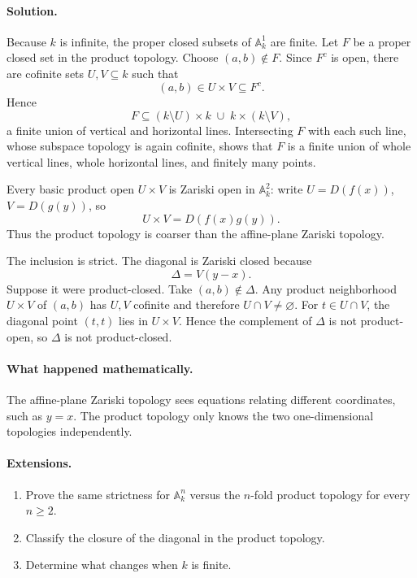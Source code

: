 \paragraph{Solution.}
Because \(k\) is infinite, the proper closed subsets of \(\mathbb A_k^1\) are finite.  Let
\(F\) be a proper closed set in the product topology.  Choose \((a,b)\notin F\).  Since
\(F^c\) is open, there are cofinite sets \(U,V\subseteq k\) such that
\[
(a,b)\in U\times V\subseteq F^c.
\]
Hence
\[
F\subseteq (k\setminus U)\times k\;\cup\;k\times(k\setminus V),
\]
a finite union of vertical and horizontal lines.  Intersecting \(F\) with each such line,
whose subspace topology is again cofinite, shows that \(F\) is a finite union of whole
vertical lines, whole horizontal lines, and finitely many points.

Every basic product open \(U\times V\) is Zariski open in \(\mathbb A_k^2\): write
\(U=D(f(x))\), \(V=D(g(y))\), so
\[
U\times V=D(f(x)g(y)).
\]
Thus the product topology is coarser than the affine-plane Zariski topology.

The inclusion is strict.  The diagonal is Zariski closed because
\[
\Delta=V(y-x).
\]
Suppose it were product-closed.  Take \((a,b)\notin\Delta\).  Any product neighborhood
\(U\times V\) of \((a,b)\) has \(U,V\) cofinite and therefore \(U\cap V\neq\varnothing\).
For \(t\in U\cap V\), the diagonal point \((t,t)\) lies in \(U\times V\).  Hence the
complement of \(\Delta\) is not product-open, so \(\Delta\) is not product-closed.

\paragraph{What happened mathematically.}
The affine-plane Zariski topology sees equations relating different coordinates, such as
\(y=x\).  The product topology only knows the two one-dimensional topologies independently.

\paragraph{Extensions.}
\begin{enumerate}
\item Prove the same strictness for \(\mathbb A_k^n\) versus the \(n\)-fold product topology
for every \(n\ge2\).
\item Classify the closure of the diagonal in the product topology.
\item Determine what changes when \(k\) is finite.
\end{enumerate}
\fi
